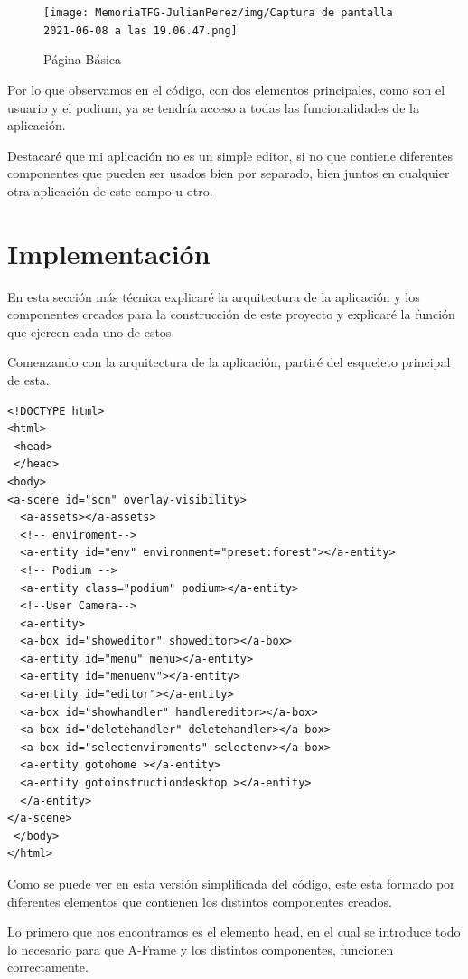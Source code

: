 \documentclass[a4paper, 12pt]{book}
\begin{document}
\begin{figure}[H]
  \centering
  \texttt{[image: MemoriaTFG-JulianPerez/img/Captura de pantalla 2021-06-08 a las 19.06.47.png]}
  \caption{Página Básica }\label{home}
\end{figure}

Por lo que observamos en el código, con dos elementos principales, como son el usuario y el podium, ya se tendría acceso a todas las funcionalidades de la aplicación.

Destacaré que mi aplicación no es un simple editor, si no que contiene diferentes componentes que pueden ser usados bien por separado, bien juntos en cualquier otra aplicación de este campo u otro.

\section{Implementación} 
\label{sec:Arquitectura resultante}
En esta sección más técnica explicaré la arquitectura de la aplicación y los componentes creados para la construcción de este proyecto y explicaré la función que ejercen cada uno de estos.

Comenzando con la arquitectura de la aplicación, partiré del esqueleto principal de esta.

\begin{verbatim}
<!DOCTYPE html>
<html>
 <head>
 </head>
<body>
<a-scene id="scn" overlay-visibility>
  <a-assets></a-assets>
  <!-- enviroment-->
  <a-entity id="env" environment="preset:forest"></a-entity>
  <!-- Podium -->
  <a-entity class="podium" podium></a-entity> 
  <!--User Camera-->
  <a-entity>
  <a-box id="showeditor" showeditor></a-box>
  <a-entity id="menu" menu></a-entity>
  <a-entity id="menuenv"></a-entity>
  <a-entity id="editor"></a-entity>
  <a-box id="showhandler" handlereditor></a-box>
  <a-box id="deletehandler" deletehandler></a-box>
  <a-box id="selectenviroments" selectenv></a-box>
  <a-entity gotohome ></a-entity>
  <a-entity gotoinstructiondesktop ></a-entity>
  </a-entity>
</a-scene>
 </body>
</html> 
\end{verbatim}

Como se puede ver en esta versión simplificada del código, este esta formado por diferentes elementos que contienen los distintos componentes creados.

Lo primero que nos encontramos es el elemento head, en el cual  se introduce todo lo necesario para que A-Frame y los distintos componentes, funcionen correctamente.
\end{document}
